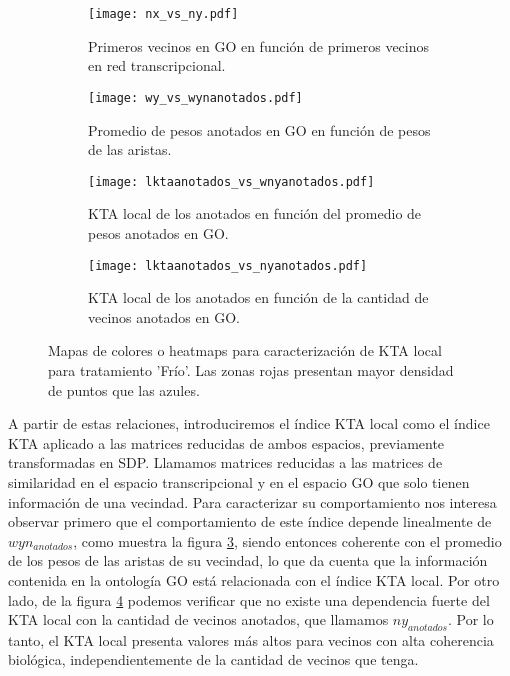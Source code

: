 \begin{sidewaysfigure}[t!]
    \centering
    \begin{subfigure}[t]{0.45\textwidth}
    \centering
    \texttt{[image: nx\_vs\_ny.pdf]}
    \caption{Primeros vecinos en GO en función de primeros vecinos en red transcripcional.}
    \label{fig:nx_vs_ny}
    \end{subfigure}    
    \begin{subfigure}[t]{0.45\textwidth}
    \centering
    \texttt{[image: wy\_vs\_wynanotados.pdf]}
    \caption{Promedio de pesos anotados en GO en función de pesos de las aristas.}
    \label{fig:wy_vs_wynanotados}
    \end{subfigure}    
    \begin{subfigure}[t]{0.45\textwidth}
    \centering
    \texttt{[image: lktaanotados\_vs\_wnyanotados.pdf]}
    \caption{KTA local de los anotados en función del promedio de pesos anotados en GO.}
    \label{fig:lktaanotados_vs_wnyanotados}
    \end{subfigure}    
    \begin{subfigure}[t]{0.45\textwidth}
    \centering
    \texttt{[image: lktaanotados\_vs\_nyanotados.pdf]}
    \caption{KTA local de los anotados en función de la cantidad de vecinos anotados en GO.}
    \label{fig:lktaanotados_vs_nyanotados}
    \end{subfigure}            
    \label{fig:ktalocal}
    \caption{Mapas de colores o heatmaps para caracterización de KTA local para tratamiento 'Frío'. Las zonas rojas presentan mayor densidad de puntos que las azules.}
\end{sidewaysfigure}

A partir de estas relaciones, introduciremos el índice KTA local como el índice KTA aplicado a las matrices reducidas de ambos espacios, previamente transformadas en SDP. Llamamos matrices reducidas a las matrices de similaridad en el espacio transcripcional y en el espacio GO que solo tienen información de una vecindad. Para caracterizar su comportamiento nos interesa observar primero que el comportamiento de este índice depende linealmente de $wyn_{anotados}$, como muestra la figura \ref{fig:lktaanotados_vs_wnyanotados}, siendo entonces coherente con el promedio de los pesos de las aristas de su vecindad, lo que da cuenta que la información contenida en la ontología GO está relacionada con el índice KTA local. Por otro lado, de la figura \ref{fig:lktaanotados_vs_nyanotados} podemos verificar que no existe una dependencia fuerte del KTA local con la cantidad de vecinos anotados, que llamamos $ny_{anotados}$. Por lo tanto, el KTA local presenta valores más altos para vecinos con alta coherencia biológica, independientemente de la cantidad de vecinos que tenga.
